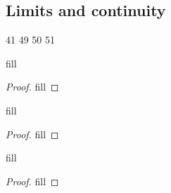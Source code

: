 \subsection{Limits and continuity}

41
49
50
51

\begin{exercise}{40}
fill
\end{exercise}
\begin{proof}
fill
\end{proof}

\begin{exercise}{45}
fill
\end{exercise}
\begin{proof}
fill
\end{proof}

\begin{exercise}{46}
fill
\end{exercise}
\begin{proof}
fill
\end{proof}